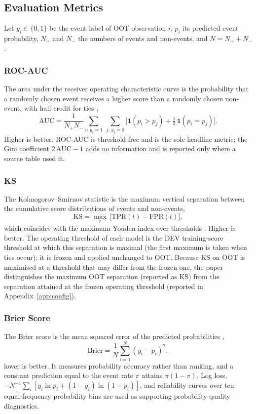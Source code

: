 \documentclass[preprint,12pt]{elsarticle}
\newcommand{\AUC}{\mathrm{AUC}}
\newcommand{\KS}{\mathrm{KS}}
\newcommand{\TPR}{\mathrm{TPR}}
\newcommand{\FPR}{\mathrm{FPR}}
\begin{document}
\subsection{Evaluation Metrics}
\label{subsec:metrics}

Let $y_i\in\{0,1\}$ be the event label of OOT observation $i$, $p_i$ its predicted event probability, $N_+$ and $N_-$ the numbers of events and non-events, and $N=N_++N_-$.

\subsubsection{ROC-AUC}
\label{subsubsec:roc_auc}
The area under the receiver operating characteristic curve is the probability that a randomly chosen event receives a higher score than a randomly chosen non-event, with half credit for ties \cite{hanley1982,fawcett2006},
\begin{equation}
    \AUC=\frac{1}{N_+N_-}\sum_{i:\,y_i=1}\ \sum_{j:\,y_j=0}\Big[\mathbf{1}(p_i>p_j)+\tfrac12\,\mathbf{1}(p_i=p_j)\Big].
    \label{eq:roc_auc}
\end{equation}
Higher is better. ROC-AUC is threshold-free and is the sole headline metric; the Gini coefficient $2\,\AUC-1$ adds no information and is reported only where a source table used it.

\subsubsection{KS}
\label{subsubsec:ks}
The Kolmogorov--Smirnov statistic is the maximum vertical separation between the cumulative score distributions of events and non-events,
\begin{equation}
    \KS=\max_{t}\,\big[\TPR(t)-\FPR(t)\big],
    \label{eq:ks}
\end{equation}
which coincides with the maximum Youden index over thresholds \cite{youden1950}. Higher is better. The operating threshold of each model is the DEV training-score threshold at which this separation is maximal (the first maximum is taken when ties occur); it is frozen and applied unchanged to OOT. Because KS on OOT is maximised at a threshold that may differ from the frozen one, the paper distinguishes the maximum OOT separation (reported as KS) from the separation attained at the frozen operating threshold (reported in Appendix~\ref{app:config}).

\subsubsection{Brier Score}
\label{subsubsec:brier}
The Brier score is the mean squared error of the predicted probabilities \cite{brier1950},
\begin{equation}
    \mathrm{Brier}=\frac{1}{N}\sum_{i=1}^{N}(y_i-p_i)^2 ,
    \label{eq:brier}
\end{equation}
lower is better. It measures probability accuracy rather than ranking, and a constant prediction equal to the event rate $\pi$ attains $\pi(1-\pi)$. Log loss, $-N^{-1}\sum_i[y_i\ln p_i+(1-y_i)\ln(1-p_i)]$, and reliability curves over ten equal-frequency probability bins \cite{degroot1983,niculescu2005} are used as supporting probability-quality diagnostics.
\end{document}
